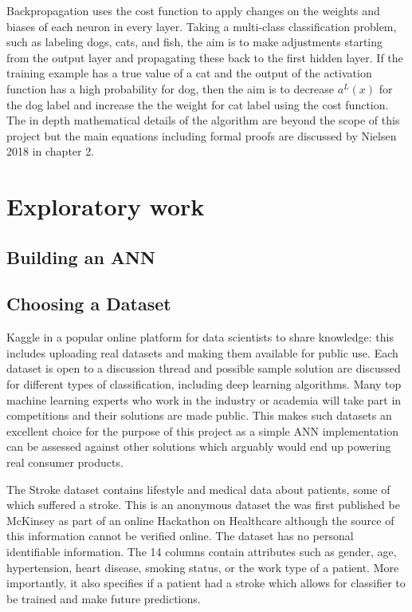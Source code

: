 \documentclass[proposal]{softeng}
\begin{document}
Backpropagation uses the cost function to apply changes on the weights and biases of each neuron in every layer. Taking a multi-class classification problem, such as labeling dogs, cats, and fish, the aim is to make adjustments starting from the output layer and propagating these back to the first hidden layer. If the training example has a true value of a cat and the output of the activation function has a high probability for dog, then the aim is to decrease \( a^L(x) \) for the dog label and increase the the weight for cat label using the cost function. The in depth mathematical details of the algorithm are beyond the scope of this project but the main equations including formal proofs are discussed by Nielsen 2018 \cite{nielsenneural} in chapter 2.

\section{Exploratory work}
\subsection{Building an ANN}
\subsection{Choosing a Dataset}
Kaggle\cite{kaggle} in a popular online platform for data scientists to share knowledge: this includes uploading real datasets and making them available for public use. Each dataset is open to a discussion thread and possible sample solution are discussed for different types of classification, including deep learning algorithms. Many top machine learning experts who work in the industry or academia will take part in competitions and their solutions are made public. This makes such datasets an excellent choice for the purpose of this project as a simple ANN implementation can be assessed against other solutions which arguably would end up powering real consumer products.

The Stroke dataset\cite{strokedataset} contains lifestyle and medical data about patients, some of which suffered a stroke. This is an anonymous dataset the was first published be McKinsey as part of an online Hackathon on Healthcare although the source of this information cannot be verified online. The dataset has no personal identifiable information. The 14 columns contain attributes such as gender, age, hypertension, heart disease, smoking status, or the work type of a patient. More importantly, it also specifies if a patient had a stroke which allows for classifier to be trained and make future predictions.
\end{document}

